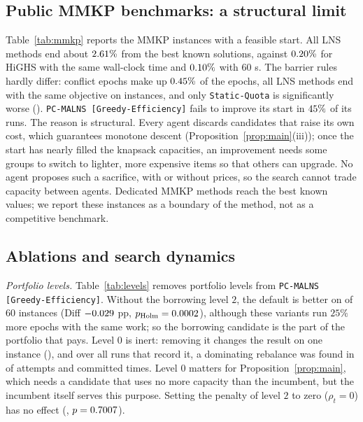 \documentclass[a4paper,fleqn]{cas-sc}
\newcommand{\pge}{\texttt{PC-MALNS [Greedy-Efficiency]}}
\begin{document}


\subsection{Public MMKP benchmarks: a structural limit}
\label{sec:mmkp}
Table~\ref{tab:mmkp} reports the \MmkpN{} MMKP instances with a feasible start. All LNS methods end about $2.61\%$ from the best known solutions, against $0.20\%$ for HiGHS with the same wall-clock time and $0.10\%$ with $60$ s. The barrier rules hardly differ: conflict epochs make up $0.45\%$ of the epochs, all LNS methods end with the same objective on \MmkpIdentical{} instances, and only \texttt{Static-Quota} is significantly worse (\MmkpWTLSQ). \pge{} fails to improve its start in $45\%$ of its runs. The reason is structural. Every agent discards candidates that raise its own cost, which guarantees monotone descent (Proposition~\ref{prop:main}(iii)); once the start has nearly filled the knapsack capacities, an improvement needs some groups to switch to lighter, more expensive items so that others can upgrade. No agent proposes such a sacrifice, with or without prices, so the search cannot trade capacity between agents. Dedicated MMKP methods \citep{chen2014, gao2017, mansini2020, lamanna2022} reach the best known values; we report these instances as a boundary of the method, not as a competitive benchmark.



\subsection{Ablations and search dynamics}
\label{sec:ablation}
\textit{Portfolio levels.} Table~\ref{tab:levels} removes portfolio levels from \pge. Without the borrowing level $2$, the default is better on \LevWinsLvOneThree{} of $60$ instances (Diff $-0.029$ pp, $p_{\text{Holm}} = 0.0002$), although these variants run $25\%$ more epochs with the same work; so the borrowing candidate is the part of the portfolio that pays. Level $0$ is inert: removing it changes the result on one instance (\LevWTLLvOneTwoThree), and over all \LZeroRuns{} runs that record it, a dominating rebalance was found in \LZeroDominated{} of \LZeroTries{} attempts and committed \LZeroCommitted{} times. Level $0$ matters for Proposition~\ref{prop:main}, which needs a candidate that uses no more capacity than the incumbent, but the incumbent itself serves this purpose. Setting the penalty of level $2$ to zero ($\rho_t = 0$) has no effect (\RhoZeroWTLV, $p = 0.7007$).
\end{document}
